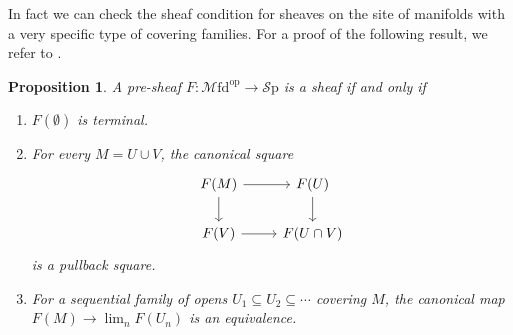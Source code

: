 \documentclass[10pt]{amsart}
\newcommand{\Sp}{\mathscr{S}\mathrm{p}}
\newcommand{\Mfd}{\mathscr{M}\mathrm{fd}}
\newcommand{\op}{\mathrm{op}}
\newtheorem{proposition}[equation]{Proposition}
\theoremstyle{definition}
\theoremstyle{remark}
\numberwithin{equation}{section}
\begin{document}
In fact we can check the sheaf condition for sheaves on the site of manifolds with a very specific type of covering families. For a proof of the following result, we refer to \cite[Proposition 3.6.6]{amabeldebrayhaine2021diffcoh}.

\begin{proposition}
  A pre-sheaf $F\colon \Mfd^{\op} \to \Sp$ is a sheaf if and only if
  \begin{enumerate}
    \item $F(\emptyset)$ is terminal.
    \item For every $M = U \cup V$, the canonical square
    \[
      \begin{tikzcd}
        F(M) \ar[r] \ar[d] & F(U) \ar[d] \\
        F(V) \ar[r] & F(U \cap V)
      \end{tikzcd}
    \]is a pullback square. 
    \item For a sequential family of opens $U_1 \subseteq U_2 \subseteq \cdots$ covering $M$, the canonical map $F(M) \to \lim_{n} F(U_n)$ is an equivalence.
  \end{enumerate}
\end{proposition}
\end{document}
